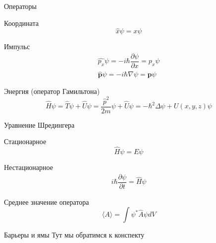 \documentclass[12]{beamer}
\begin{document}
\begin{frame}[t]{Операторы}
\begin{block}{Координата}
\begin{equation*}
    \hat{x}\psi = x\psi
\end{equation*}
\end{block}

\begin{block}{Импульс}
\begin{gather*}
    \hat{p_x}\psi = -i\hbar\dfrac{\partial\psi}{\partial x} = p_x \psi\\
    \hat{\textbf{p}}\psi = -i\hbar\nabla\psi = \textbf{p} \psi
\end{gather*}
\end{block}

\begin{block}{Энергия (оператор Гамильтона)}
\begin{equation*}
    \hat{H}\psi = \hat{T}\psi + \hat{U}\psi = \dfrac{\hat{p}^2}{2m}\psi + \hat{U}\psi  = -\hbar^2\Delta\psi + U(x,y,z)\psi
\end{equation*}
\end{block}

\end{frame}

\begin{frame}[t]{Уравнение Шредингера}
\begin{block}{Стационарное}
\begin{equation*}
    \hat{H}\psi = E\psi
\end{equation*}
\end{block}

\begin{block}{Нестационарное}
\begin{gather*}
    i\hbar\dfrac{\partial\psi}{\partial t} = \hat{H}\psi
\end{gather*}
\end{block}

\begin{block}{Среднее значение оператора}
\begin{equation*}
    \langle A\rangle = \int\psi^*\hat{A}\psi dV
\end{equation*}
\end{block}

\end{frame}


\begin{frame}[t]{Барьеры и ямы}
Тут мы обратимся к конспекту
\end{frame}
\end{document}
